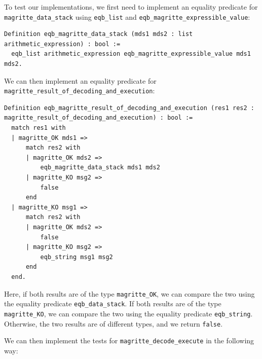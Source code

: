 \documentclass{article}
\begin{document}
To test our implementations, we first need to implement an equality predicate for \texttt{magritte\_data\_stack} using \texttt{eqb\_list} and \texttt{eqb\_magritte\_expressible\_value}:

\begin{lstlisting}
Definition eqb_magritte_data_stack (mds1 mds2 : list arithmetic_expression) : bool :=
  eqb_list arithmetic_expression eqb_magritte_expressible_value mds1 mds2.
\end{lstlisting}

We can then implement an equality predicate for \texttt{magritte\_result\_of\_decoding\_and\_execution}:

\begin{lstlisting}
Definition eqb_magritte_result_of_decoding_and_execution (res1 res2 : magritte_result_of_decoding_and_execution) : bool :=
  match res1 with
  | magritte_OK mds1 =>
      match res2 with
      | magritte_OK mds2 =>
          eqb_magritte_data_stack mds1 mds2
      | magritte_KO msg2 =>
          false
      end
  | magritte_KO msg1 =>
      match res2 with
      | magritte_OK mds2 =>
          false
      | magritte_KO msg2 =>
          eqb_string msg1 msg2
      end
  end.
\end{lstlisting}

Here, if both results are of the type \texttt{magritte\_OK}, we can compare the two using the equality predicate \texttt{eqb\_data\_stack}. If both results are of the type \texttt{magritte\_KO}, we can compare the two using the equality predicate \texttt{eqb\_string}. Otherwise, the two results are of different types, and we return \texttt{false}.

We can then implement the tests for \texttt{magritte\_decode\_execute} in the following way:
\end{document}
